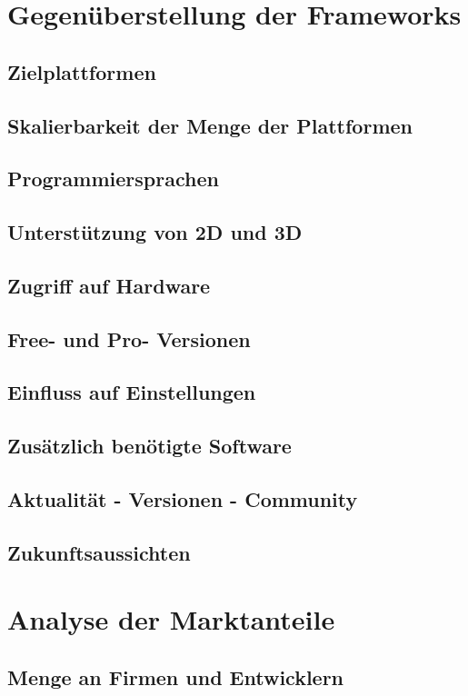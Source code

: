 \chapter{Gegenüberstellung der Frameworks}
\section{Zielplattformen}
\section{Skalierbarkeit der Menge der Plattformen} %
\section{Programmiersprachen}
\section{Unterstützung von 2D und 3D}
\section{Zugriff auf Hardware}%
\section{Free- und Pro- Versionen}
\section{Einfluss auf Einstellungen}
\section{Zusätzlich benötigte Software}
\section{Aktualität - Versionen - Community}
\section{Zukunftsaussichten}

\chapter{Analyse der Marktanteile}
\section{Menge an Firmen und Entwicklern}

